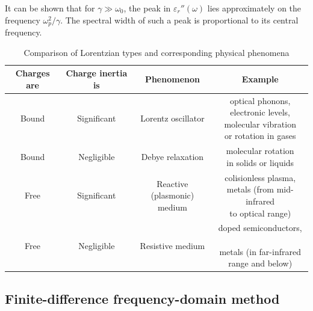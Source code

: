 It can be shown that for $\gamma \gg \omega_0$, the peak in $\varepsilon_r''(\omega)$ lies approximately on the frequency $\omega_p^{2}/\gamma$. The spectral width of such a peak is proportional to its central frequency. 

\begin{table}[ht]   \caption{Comparison of Lorentzian types and corresponding physical phenomena}  \label{tb_lorentzians} \centering 
\begin{tabular}{cc|cc}
 \toprule
\textbf{Charges are}	& \textbf{Charge inertia is}				& \textbf{Phenomenon}				& \textbf{Example}		 \\
 \hline
Bound		& Significant				& Lorentz oscillator					& \shortstack{optical phonons, \\electronic levels,\\ molecular vibration \\or rotation in gases}	\\
 \hline
Bound		& Negligible				& Debye relaxation						& \shortstack{molecular rotation \\in solids or liquids} \\
 \hline
Free	    & Significant				& \shortstack{Reactive\\(plasmonic) medium}			& \shortstack{colisionless plasma, \\metals (from mid-infrared\\to optical range)} \\
 \hline
Free	    & Negligible				& Resistive medium						& \shortstack{doped semiconductors,\\\newline metals (in far-infrared\\ range and below)} \\
 \bottomrule
 \end{tabular} \end{table}

\subsection{Finite-difference frequency-domain method} %
